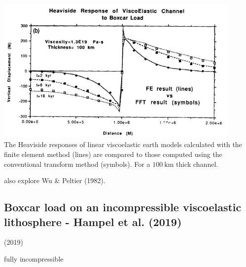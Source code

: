 \begin{center}
\includegraphics[width=12cm]{images/viscoelasticity/wu92}\\
{\captionfont The Heaviside responses of linear viscoelastic earth models calculated 
with the finite element method (lines) are compared to those computed using the conventional 
transform method (symbols). For a $100~\si{\km}$ thick channel.}
\end{center}

also explore Wu \& Peltier \cite{wupe82} (1982).


\subsection{Boxcar load on an incompressible viscoelastic lithosphere - Hampel et al. (2019)}


\textcite{halk19} (2019)

{\color{orange} fully incompressible}

